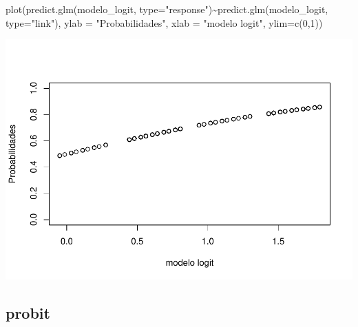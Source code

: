 \documentclass[
]{article}
\newenvironment{Shaded}{\begin{snugshade}}{\end{snugshade}}
\newcommand{\AttributeTok}[1]{\textcolor[rgb]{0.77,0.63,0.00}{#1}}
\newcommand{\DecValTok}[1]{\textcolor[rgb]{0.00,0.00,0.81}{#1}}
\newcommand{\FunctionTok}[1]{\textcolor[rgb]{0.00,0.00,0.00}{#1}}
\newcommand{\NormalTok}[1]{#1}
\newcommand{\OtherTok}[1]{\textcolor[rgb]{0.56,0.35,0.01}{#1}}
\newcommand{\SpecialCharTok}[1]{\textcolor[rgb]{0.00,0.00,0.00}{#1}}
\newcommand{\StringTok}[1]{\textcolor[rgb]{0.31,0.60,0.02}{#1}}
\begin{document}
\begin{Shaded}
\begin{Highlighting}[]
\FunctionTok{plot}\NormalTok{(}\FunctionTok{predict.glm}\NormalTok{(modelo\_logit, }\AttributeTok{type=}\StringTok{"response"}\NormalTok{)}\SpecialCharTok{\textasciitilde{}}\FunctionTok{predict.glm}\NormalTok{(modelo\_logit, }\AttributeTok{type=}\StringTok{"link"}\NormalTok{),}
     \AttributeTok{ylab =} \StringTok{"Probabilidades"}\NormalTok{,}
     \AttributeTok{xlab =}  \StringTok{"modelo logit"}\NormalTok{,}
     \AttributeTok{ylim=}\FunctionTok{c}\NormalTok{(}\DecValTok{0}\NormalTok{,}\DecValTok{1}\NormalTok{))}
\end{Highlighting}
\end{Shaded}

\includegraphics{EDA__files/figure-latex/unnamed-chunk-10-2.pdf}

\hypertarget{probit}{%
\subsection{probit}\label{probit}}

\begin{Shaded}
\end{Shaded}
\end{document}
